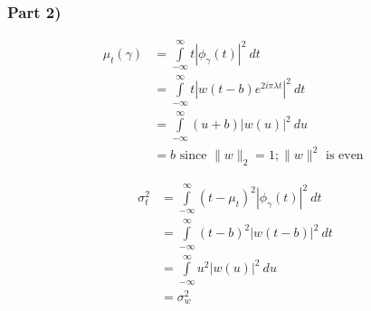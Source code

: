 \subsubsection{Part 2)}
\begin{align*}
    \mu_t(\gamma) &= \int\limits_{-\infty}^{\infty} t \left | \phi_{\gamma}(t) \right | ^2
    \ dt \\
                  &= \int\limits_{-\infty}^{\infty} t \left | w(t-b) e^{ 2i\pi\lambda t}  \right | ^2
    \ dt \\
                  &= \int\limits_{-\infty}^{\infty} (u+b) \left | w(u)\right | ^2\ du \\
                   &= b \text{ since } \| w \|^{ }_{ 2} = 1; \| w \|^{ 2}_{ } \text{ is
                   even }
\end{align*}

\begin{align*}
    \sigma_t^2 &= \int\limits_{-\infty}^{\infty}\left( t-\mu_t\right) ^2 \left |
    \phi_{\gamma} (t) \right | ^2 \ dt \\ 
 &= \int\limits_{-\infty}^{\infty} \left( t-b\right) ^2 \left | w\left( t-b\right)  \right
 | ^2 \ dt \\ 
 &= \int\limits_{-\infty}^{\infty} u^2 \left | w(u) \right | ^2 \ du \\ 
  &= \sigma^2_w \\ 
\end{align*}

